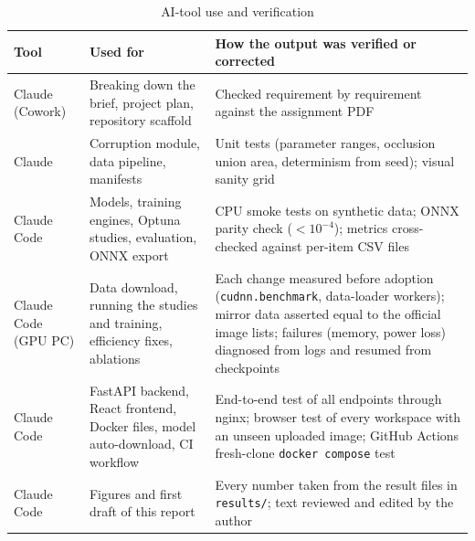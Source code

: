 \documentclass[conference]{IEEEtran}
\begin{document}
\begin{table}[h]
\centering\caption{AI-tool use and verification}\label{tab:ai}
\scriptsize\setlength{\tabcolsep}{2pt}
\begin{tabular}{@{}p{}p{}p{}@{}}
\toprule
Tool & Used for & How the output was verified or corrected\\
\midrule
Claude (Cowork) & Breaking down the brief, project plan, repository scaffold & Checked requirement by requirement against the assignment PDF\\
Claude & Corruption module, data pipeline, manifests & Unit tests (parameter ranges, occlusion union area, determinism from seed); visual sanity grid\\
Claude Code & Models, training engines, Optuna studies, evaluation, ONNX export & CPU smoke tests on synthetic data; ONNX parity check ($<10^{-4}$); metrics cross-checked against per-item CSV files\\
Claude Code (GPU PC) & Data download, running the studies and training, efficiency fixes, ablations & Each change measured before adoption (\texttt{cudnn.benchmark}, data-loader workers); mirror data asserted equal to the official image lists; failures (memory, power loss) diagnosed from logs and resumed from checkpoints\\
Claude Code & FastAPI backend, React frontend, Docker files, model auto-download, CI workflow & End-to-end test of all endpoints through nginx; browser test of every workspace with an unseen uploaded image; GitHub Actions fresh-clone \texttt{docker compose} test\\
Claude Code & Figures and first draft of this report & Every number taken from the result files in \texttt{results/}; text reviewed and edited by the author\\
\bottomrule
\end{tabular}
\end{table}
\end{document}
